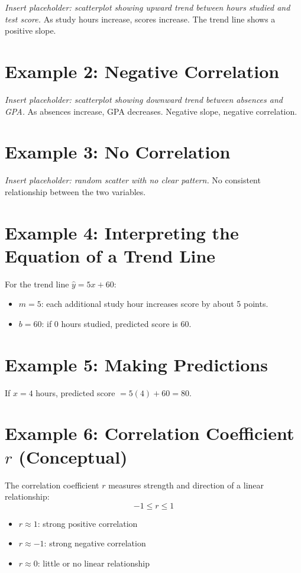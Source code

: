 \documentclass[12pt]{article}
\begin{document}
\textit{Insert placeholder: scatterplot showing upward trend between hours studied and test score.}  
As study hours increase, scores increase.  
The trend line shows a positive slope.

\section*{Example 2: Negative Correlation}

\textit{Insert placeholder: scatterplot showing downward trend between absences and GPA.}  
As absences increase, GPA decreases.  
Negative slope, negative correlation.

\section*{Example 3: No Correlation}

\textit{Insert placeholder: random scatter with no clear pattern.}  
No consistent relationship between the two variables.

\section*{Example 4: Interpreting the Equation of a Trend Line}

For the trend line \(\hat{y} = 5x + 60\):  
\begin{itemize}
  \item \(m = 5\): each additional study hour increases score by about 5 points.  
  \item \(b = 60\): if 0 hours studied, predicted score is 60.
\end{itemize}

\section*{Example 5: Making Predictions}

If \(x = 4\) hours, predicted score \(= 5(4)+60=80\).

\section*{Example 6: Correlation Coefficient \(r\) (Conceptual)}

The correlation coefficient \(r\) measures strength and direction of a linear relationship:  
\[
-1 \le r \le 1
\]
\begin{itemize}
  \item \(r \approx 1\): strong positive correlation  
  \item \(r \approx -1\): strong negative correlation  
  \item \(r \approx 0\): little or no linear relationship
\end{itemize}
\end{document}
